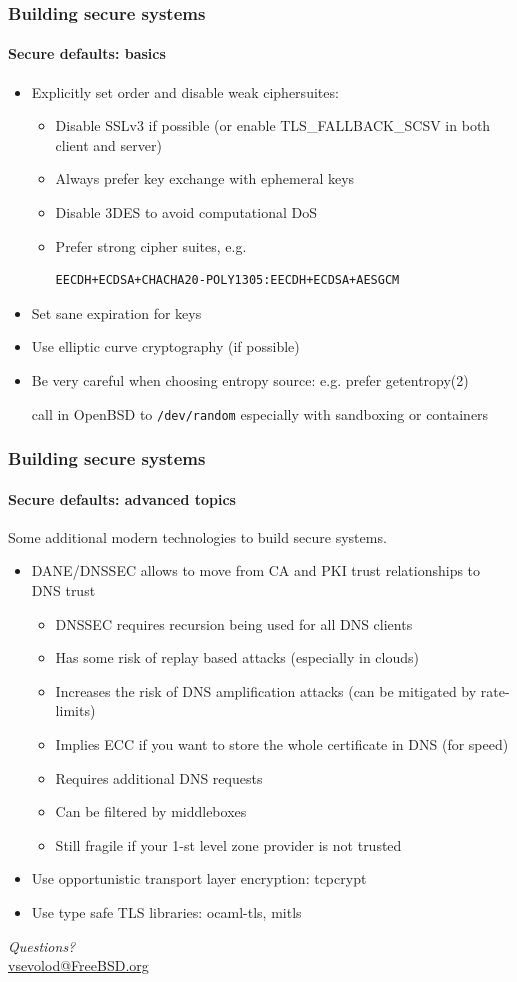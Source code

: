 \documentclass[11pt,t]{beamer}
\newcommand{\funcname}[1]{
	{\color{yellow!30} #1}
}
\begin{document}
\begin{frame}[fragile]
\frametitle{Building secure systems}
\framesubtitle{Secure defaults: basics}
\begin{itemize}
\item Explicitly set order and disable weak ciphersuites:
	\begin{itemize}
	\item Disable SSLv3 if possible (or enable \funcname{TLS\_FALLBACK\_SCSV} in both 
	client and server)
	\item Always prefer key exchange with ephemeral keys
	\item Disable 3DES to avoid computational DoS
	\item Prefer strong cipher suites, e.g. 
	{\tiny 
	\begin{verbatim}EECDH+ECDSA+CHACHA20-POLY1305:EECDH+ECDSA+AESGCM\end{verbatim}
	}
	\end{itemize}
\item Set sane expiration for keys
\item Use elliptic curve cryptography (if possible)
\item Be very careful when choosing entropy source: e.g. prefer \funcname{getentropy(2)} 
call in OpenBSD to \texttt{/dev/random} especially with sandboxing or containers
\end{itemize}
\end{frame}

\begin{frame}[fragile]
\frametitle{Building secure systems}
\framesubtitle{Secure defaults: advanced topics}
Some additional modern technologies to build secure systems.
\begin{itemize}
\item DANE/DNSSEC allows to move from CA and PKI trust relationships to DNS trust
\begin{itemize}
\item DNSSEC requires recursion being used for all DNS clients
\item Has some risk of replay based attacks (especially in clouds)
\item Increases the risk of DNS amplification attacks (can be mitigated by rate-limits)
\item Implies ECC if you want to store the whole certificate in DNS (for speed)
\item Requires additional DNS requests
\item Can be filtered by middleboxes
\item Still fragile if your 1-st level zone provider is not trusted
\end{itemize}
\item Use opportunistic transport layer encryption: tcpcrypt
\item Use type safe TLS libraries: ocaml-tls, mitls
\end{itemize}
\end{frame}

\begin{frame}
\vfill\vfill\centering
\emph{Questions?} \\[4pt]
\url{vsevolod@FreeBSD.org}
\vfill\vfill
\end{frame}
\end{document}
